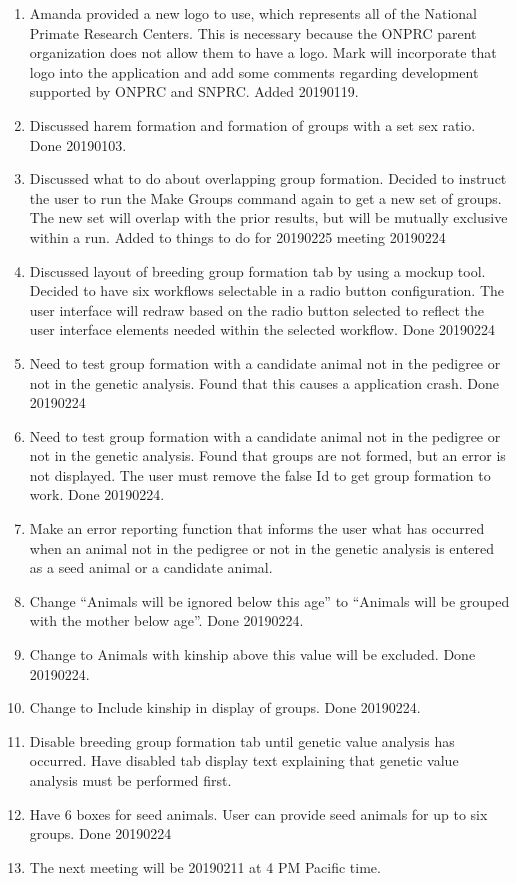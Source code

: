 \documentclass[
]{article}
\begin{document}
\begin{enumerate}
\def\labelenumi{\arabic{enumi}.}
\item
  Amanda provided a new logo to use, which represents all of the
  National Primate Research Centers. This is necessary because the ONPRC
  parent organization does not allow them to have a logo. Mark will
  incorporate that logo into the application and add some comments
  regarding development supported by ONPRC and SNPRC. Added 20190119.
\item
  Discussed harem formation and formation of groups with a set sex
  ratio. Done 20190103.
\item
  Discussed what to do about overlapping group formation. Decided to
  instruct the user to run the Make Groups command again to get a new
  set of groups. The new set will overlap with the prior results, but
  will be mutually exclusive within a run. Added to things to do for
  20190225 meeting 20190224
\item
  Discussed layout of breeding group formation tab by using a mockup
  tool. Decided to have six workflows selectable in a radio button
  configuration. The user interface will redraw based on the radio
  button selected to reflect the user interface elements needed within
  the selected workflow. Done 20190224
\item
  Need to test group formation with a candidate animal not in the
  pedigree or not in the genetic analysis. Found that this causes a
  application crash. Done 20190224
\item
  Need to test group formation with a candidate animal not in the
  pedigree or not in the genetic analysis. Found that groups are not
  formed, but an error is not displayed. The user must remove the false
  Id to get group formation to work. Done 20190224.
\item
  Make an error reporting function that informs the user what has
  occurred when an animal not in the pedigree or not in the genetic
  analysis is entered as a seed animal or a candidate animal.
\item
  Change ``Animals will be ignored below this age'' to ``Animals will be
  grouped with the mother below age''. Done 20190224.
\item
  Change to Animals with kinship above this value will be excluded. Done
  20190224.
\item
  Change to Include kinship in display of groups. Done 20190224.
\item
  Disable breeding group formation tab until genetic value analysis has
  occurred. Have disabled tab display text explaining that genetic value
  analysis must be performed first.
\item
  Have 6 boxes for seed animals. User can provide seed animals for up to
  six groups. Done 20190224
\item
  The next meeting will be 20190211 at 4 PM Pacific time.
\end{enumerate}
\end{document}
